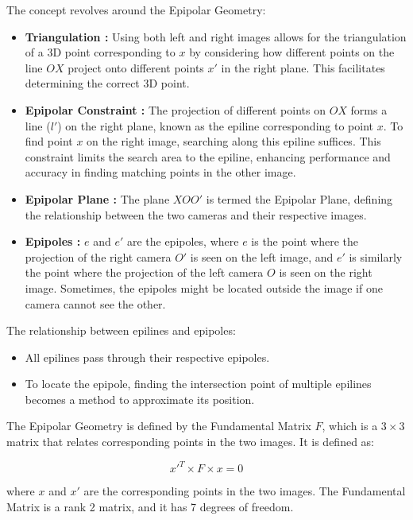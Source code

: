 \documentclass[10pt,twocolumn,letterpaper]{article}
\begin{document}
The concept revolves around the Epipolar Geometry:

\begin{itemize}
    \item \textbf{Triangulation :} Using both left and right images allows for the triangulation of a 3D point corresponding to \(x\) by considering how different points on the line \(OX\) project onto different points \(x'\) in the right plane. This facilitates determining the correct 3D point.
    
    \item \textbf{Epipolar Constraint :} The projection of different points on \(OX\) forms a line (\(l'\)) on the right plane, known as the epiline corresponding to point \(x\). To find point \(x\) on the right image, searching along this epiline suffices. This constraint limits the search area to the epiline, enhancing performance and accuracy in finding matching points in the other image.
    
    \item \textbf{Epipolar Plane :} The plane \(XOO'\) is termed the Epipolar Plane, defining the relationship between the two cameras and their respective images.
    
    \item \textbf{Epipoles :} \(e\) and \(e'\) are the epipoles, where \(e\) is the point where the projection of the right camera \(O'\) is seen on the left image, and \(e'\) is similarly the point where the projection of the left camera \(O\) is seen on the right image. Sometimes, the epipoles might be located outside the image if one camera cannot see the other.
\end{itemize}

The relationship between epilines and epipoles:

\begin{itemize}
    \item All epilines pass through their respective epipoles.
    \item To locate the epipole, finding the intersection point of multiple epilines becomes a method to approximate its position.
\end{itemize}

The Epipolar Geometry is defined by the Fundamental Matrix \(F\), which is a \(3 \times 3\) matrix that relates corresponding points in the two images. It is defined as:

\[
x'^T \times F \times x = 0
\]

where \(x\) and \(x'\) are the corresponding points in the two images. The Fundamental Matrix is a rank 2 matrix, and it has 7 degrees of freedom. 
\end{document}
